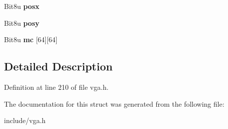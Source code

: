 \begin{DoxyCompactItemize}
\item 
\hypertarget{structVGA__HWCURSOR_abf50682342447c46dd13676cd0596281}{Bit8u {\bfseries posx}}\label{structVGA__HWCURSOR_abf50682342447c46dd13676cd0596281}

\item 
\hypertarget{structVGA__HWCURSOR_a436c666c0e7ef856d7ca98a6e5f30bd0}{Bit8u {\bfseries posy}}\label{structVGA__HWCURSOR_a436c666c0e7ef856d7ca98a6e5f30bd0}

\item 
\hypertarget{structVGA__HWCURSOR_a8c67327cfdedc8e3cb9a1a1d4d1d0e20}{Bit8u {\bfseries mc} \mbox{[}64\mbox{]}\mbox{[}64\mbox{]}}\label{structVGA__HWCURSOR_a8c67327cfdedc8e3cb9a1a1d4d1d0e20}

\end{DoxyCompactItemize}


\subsection{Detailed Description}


Definition at line 210 of file vga.\-h.



The documentation for this struct was generated from the following file\-:\begin{DoxyCompactItemize}
\item 
include/vga.\-h\end{DoxyCompactItemize}
